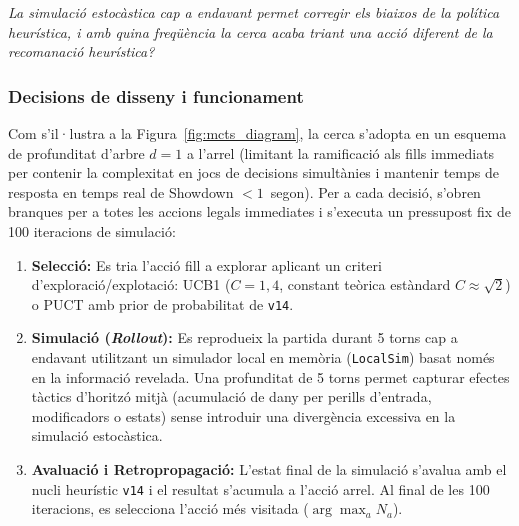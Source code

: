 \emph{La simulació estocàstica cap a endavant permet corregir els biaixos de la política heurística, i amb quina freqüència la cerca acaba triant una acció diferent de la recomanació heurística?}

\subsubsection*{Decisions de disseny i funcionament}

Com s'il·lustra a la Figura~\ref{fig:mcts_diagram}, la cerca s'adopta en un esquema de profunditat d'arbre $d=1$ a l'arrel (limitant la ramificació als fills immediats per contenir la complexitat en jocs de decisions simultànies i mantenir temps de resposta en temps real de Showdown $< 1$~segon). Per a cada decisió, s'obren branques per a totes les accions legals immediates i s'executa un pressupost fix de 100 iteracions de simulació:

\begin{enumerate}
    \item \textbf{Selecció:} Es tria l'acció fill a explorar aplicant un criteri d'exploració/explotació: UCB1 ($C=1{,}4$, constant teòrica estàndard $C \approx \sqrt{2}$) o PUCT amb prior de probabilitat de \texttt{v14}.
    \item \textbf{Simulació (\emph{Rollout}):} Es reprodueix la partida durant 5 torns cap a endavant utilitzant un simulador local en memòria (\texttt{LocalSim}) basat només en la informació revelada. Una profunditat de 5 torns permet capturar efectes tàctics d'horitzó mitjà (acumulació de dany per perills d'entrada, modificadors o estats) sense introduir una divergència excessiva en la simulació estocàstica.
    \item \textbf{Avaluació i Retropropagació:} L'estat final de la simulació s'avalua amb el nucli heurístic \texttt{v14} i el resultat s'acumula a l'acció arrel. Al final de les 100 iteracions, es selecciona l'acció més visitada ($\arg\max_a N_a$).
\end{enumerate}

